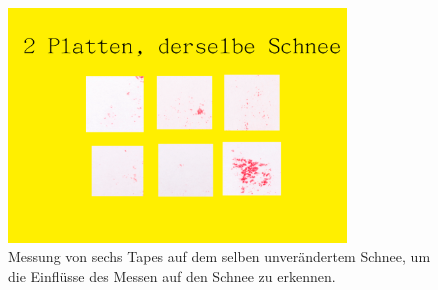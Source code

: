 \begin{figure}[H]
    \centering
    \includegraphics[width=0.8\textwidth]{Bilder/2PlattenSelberSchnee.png}
    \caption{Messung von sechs Tapes auf dem selben unverändertem Schnee, um die Einflüsse des Messen auf den Schnee zu erkennen.} 
    \label{fig:selberSchnee}
\end{figure}
